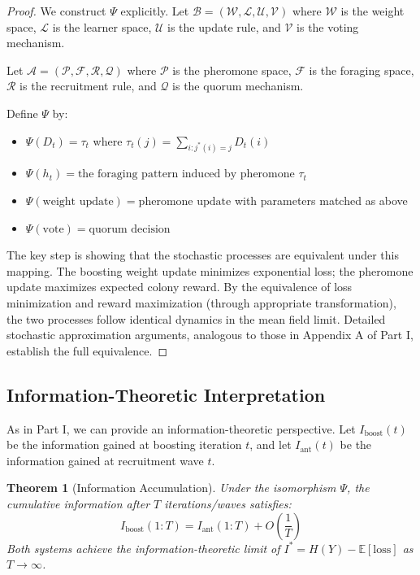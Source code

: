 \documentclass[12pt,letterpaper]{article}
\newtheorem{theorem}{Theorem}[section]
\begin{document}
\begin{proof}
We construct $\Psi$ explicitly. Let $\mathcal{B} = (\mathcal{W}, \mathcal{L}, \mathcal{U}, \mathcal{V})$ where $\mathcal{W}$ is the weight space, $\mathcal{L}$ is the learner space, $\mathcal{U}$ is the update rule, and $\mathcal{V}$ is the voting mechanism.

Let $\mathcal{A} = (\mathcal{P}, \mathcal{F}, \mathcal{R}, \mathcal{Q})$ where $\mathcal{P}$ is the pheromone space, $\mathcal{F}$ is the foraging space, $\mathcal{R}$ is the recruitment rule, and $\mathcal{Q}$ is the quorum mechanism.

Define $\Psi$ by:
\begin{itemize}
    \item $\Psi(D_t) = \tau_t$ where $\tau_t(j) = \sum_{i: j^*(i)=j} D_t(i)$
    \item $\Psi(h_t) = \text{the foraging pattern induced by pheromone } \tau_t$
    \item $\Psi(\text{weight update}) = \text{pheromone update}$ with parameters matched as above
    \item $\Psi(\text{vote}) = \text{quorum decision}$
\end{itemize}

The key step is showing that the stochastic processes are equivalent under this mapping. The boosting weight update minimizes exponential loss; the pheromone update maximizes expected colony reward. By the equivalence of loss minimization and reward maximization (through appropriate transformation), the two processes follow identical dynamics in the mean field limit. Detailed stochastic approximation arguments, analogous to those in Appendix A of Part I, establish the full equivalence.
\end{proof}

\subsection{Information-Theoretic Interpretation}

As in Part I, we can provide an information-theoretic perspective. Let $I_{\text{boost}}(t)$ be the information gained at boosting iteration $t$, and let $I_{\text{ant}}(t)$ be the information gained at recruitment wave $t$.

\begin{theorem}[Information Accumulation]
Under the isomorphism $\Psi$, the cumulative information after $T$ iterations/waves satisfies:
\begin{equation}
I_{\text{boost}}(1:T) = I_{\text{ant}}(1:T) + O\left(\frac{1}{T}\right)
\end{equation}
Both systems achieve the information-theoretic limit of $I^* = H(Y) - \mathbb{E}[\text{loss}]$ as $T \to \infty$.
\end{theorem}
\end{document}

